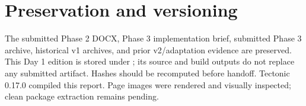 \documentclass[10pt]{article}
\begin{document}
\section{Preservation and versioning}
\begin{sloppypar}
The submitted Phase 2 DOCX, Phase 3 implementation brief, submitted Phase 3 archive, historical v1 archives, and prior v2/adaptation evidence are preserved. This Day 1 edition is stored under ; its source and build outputs do not replace any submitted artifact. Hashes should be recomputed before handoff. Tectonic 0.17.0 compiled this report. Page images were rendered and visually inspected; clean package extraction remains pending.
\end{sloppypar}



\end{document}
